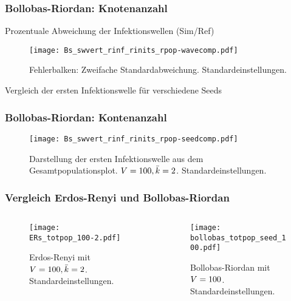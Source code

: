 \begin{frame}[t]
    \frametitle{Bollobas-Riordan: Knotenanzahl}
    Prozentuale Abweichung der Infektionswellen (Sim/Ref)
    \begin{figure}[htpb]
        \centering
            \texttt{[image: Bs\_swvert\_rinf\_rinits\_rpop-wavecomp.pdf]} \caption{Fehlerbalken: Zweifache Standardabweichung. Standardeinstellungen.}%
            \label{fig:Bs_swvert_finf_rinit_rpop-wavecomp}
    \end{figure}
\end{frame}

\begin{frame}[t]
    Vergleich der ersten Infektionswelle für verschiedene Seeds
    \frametitle{Bollobas-Riordan: Kontenanzahl}
    \begin{figure}[htpb]
        \centering
        \texttt{[image: Bs\_swvert\_rinf\_rinits\_rpop-seedcomp.pdf]}
        \caption{Darstellung der ersten Infektionswelle aus dem Gesamtpopulationsplot. $V = 100, \bar{k}=2$.
        Standardeinstellungen.}%
        \label{fig:Bs_swvert_rinf_rinits_rpop-seedcomp}
    \end{figure}
\end{frame}

\begin{frame}[t]
    \frametitle{Vergleich Erdos-Renyi und Bollobas-Riordan}
    \begin{columns}
        \begin{column}{0.5\textwidth}
            \begin{figure}[htpb]
                \centering
                \texttt{[image: ERs\_totpop\_100-2.pdf]}
                \caption{Erdos-Renyi mit $V = 100, \bar{k} = 2$.
                Standardeinstellungen.}%
                \label{fig:ERs_totpop_100-2}
            \end{figure}
        \end{column}
        \begin{column}{0.5\textwidth}
            \begin{figure}[htpb]
                \centering
                \texttt{[image: bollobas\_totpop\_seed\_100.pdf]}
                \caption{Bollobas-Riordan mit $V = 100$.
                Standardeinstellungen.}%
                \label{fig:bollobas_totpop_seed_100}
            \end{figure}
        \end{column}
    \end{columns}
\end{frame}

